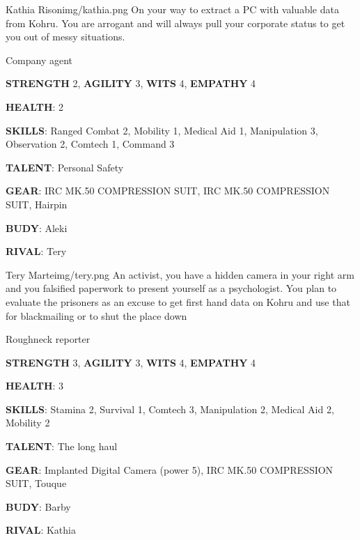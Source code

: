 \medskip \medskip \medskip \medskip


\begin{rpg-pcbox}{Kathia Rison}{img/kathia.png}
    On your way to extract a PC with valuable data from Kohru. 
    You are arrogant and will always pull your corporate status to get you out of messy situations.    
\end{rpg-pcbox}

\begin{rpg-commentbox}{}
    Company agent

    \textbf{STRENGTH} 2, \textbf{AGILITY} 3, \textbf{WITS} 4, \textbf{EMPATHY} 4

    \textbf{HEALTH}: 2

    \textbf{SKILLS}: Ranged Combat 2, Mobility 1, Medical Aid 1, Manipulation 3, Observation 2, Comtech 1, Command 3
    
    \textbf{TALENT}: Personal Safety
    
    \textbf{GEAR}: IRC MK.50 COMPRESSION SUIT, IRC MK.50 COMPRESSION SUIT, Hairpin

    \textbf{BUDY}: Aleki
    
    \textbf{RIVAL}: Tery
\end{rpg-commentbox}


\newsect

\begin{rpg-pcbox}{Tery Marte}{img/tery.png}
    An activist, you have a hidden camera in your right arm and you falsified paperwork to present yourself as a psychologist. You plan to evaluate the prisoners as an excuse to get first hand data on Kohru and use that for blackmailing or to shut the place down
\end{rpg-pcbox}

\begin{rpg-commentbox}{}
    Roughneck reporter

    \textbf{STRENGTH} 3, \textbf{AGILITY} 3, \textbf{WITS} 4, \textbf{EMPATHY} 4

    \textbf{HEALTH}: 3

    \textbf{SKILLS}: Stamina 2, Survival 1, Comtech 3, Manipulation 2, Medical Aid 2, Mobility 2
    
    \textbf{TALENT}: The long haul
    
    \textbf{GEAR}: Implanted Digital Camera (power 5), IRC MK.50 COMPRESSION SUIT, Touque

    
    \textbf{BUDY}: Barby
    
    \textbf{RIVAL}: Kathia
\end{rpg-commentbox}


